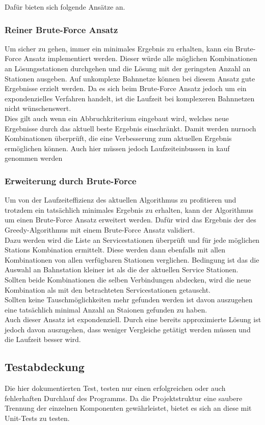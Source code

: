 Dafür bieten sich folgende Ansätze an. \\

\subsubsection{Reiner Brute-Force Ansatz}\label{sec:brute-force}
Um sicher zu gehen, immer ein minimales Ergebnis zu erhalten, kann ein Brute-Force Ansatz implementiert werden. Dieser würde alle möglichen Kombinationen an Lösungsstationen durchgehen und die Lösung mit der geringsten Anzahl an Stationen ausgeben. Auf unkomplexe Bahnnetze können bei diesem Ansatz gute Ergebnisse erzielt werden. Da es sich beim Brute-Force Ansatz jedoch um ein expondenzielles Verfahren handelt, ist die Laufzeit bei komplexeren Bahnnetzen nicht wünschenswert.\\
Dies gilt auch wenn ein Abbruchkriterium eingebaut wird, welches neue Ergebnisse durch das aktuell beste Ergebnis einschränkt. Damit werden nurnoch Kombinationen überprüft, die eine Verbesserung zum aktuellen Ergebnis ermöglichen können. Auch hier müssen jedoch Laufzeiteinbussen in kauf genommen werden\\

\subsubsection{Erweiterung durch Brute-Force}
Um von der Laufzeiteffizienz des aktuellen Algorithmus zu profitieren und trotzdem ein tatsächlich minimales Ergebnis zu erhalten, kann der Algorithmus um einen Brute-Force Ansatz erweitert werden. Dafür wird das Ergebnis der des Greedy-Algorithmus mit einem Brute-Force Ansatz validiert.\\
Dazu werden wird die Liste an Servicestationen überprüft und für jede möglichen Stations Kombination ermittelt. Diese werden dann ebenfalls mit allen Kombinationen von allen verfügbaren Stationen verglichen. Bedingung ist das die Auswahl an Bahnstation kleiner ist als die der aktuellen Service Stationen. Sollten beide Kombinationen die selben Verbindungen abdecken, wird die neue Kombination als mit den betrachteten Servicestationen getauscht.\\
Sollten keine Tauschmöglichkeiten mehr gefunden werden ist davon auszugehen eine tatsächlich minimal Anzahl an Staionen gefunden zu haben.\\
Auch dieser Ansatz ist expondenziell. Durch eine bereits approximierte Lösung ist jedoch davon auszugehen, dass weniger Vergleiche getätigt werden müssen und die Laufzeit besser wird.\\

\subsection{Testabdeckung}\label{sec:testabdeckung}
Die hier dokumentierten Test, testen nur einen erfolgreichen oder auch fehlerhaften Durchlauf des Programms. Da die Projektstruktur eine saubere Trennung der einzelnen Komponenten gewährleistet, bietet es sich an diese mit Unit-Tests zu testen.\\